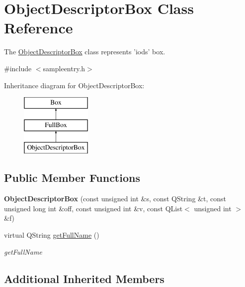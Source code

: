 \hypertarget{class_object_descriptor_box}{\section{Object\-Descriptor\-Box Class Reference}
\label{class_object_descriptor_box}
}


The \hyperlink{class_object_descriptor_box}{Object\-Descriptor\-Box} class represents 'iods' box.  




{\ttfamily \#include $<$sampleentry.\-h$>$}

Inheritance diagram for Object\-Descriptor\-Box\-:\begin{figure}[H]
\begin{center}
\leavevmode
\includegraphics[height=3.000000cm]{class_object_descriptor_box}
\end{center}
\end{figure}
\subsection*{Public Member Functions}
\begin{DoxyCompactItemize}
\item 
\hypertarget{class_object_descriptor_box_aa1587ec019949166fbfc9a112fa68c11}{{\bfseries Object\-Descriptor\-Box} (const unsigned int \&s, const Q\-String \&t, const unsigned long int \&off, const unsigned int \&v, const Q\-List$<$ unsigned int $>$ \&f)}\label{class_object_descriptor_box_aa1587ec019949166fbfc9a112fa68c11}

\item 
virtual Q\-String \hyperlink{class_object_descriptor_box_ae01792b840bd4547ecc0aba4ee665998}{get\-Full\-Name} ()
\begin{DoxyCompactList}\small\item\em get\-Full\-Name \end{DoxyCompactList}\end{DoxyCompactItemize}
\subsection*{Additional Inherited Members}


